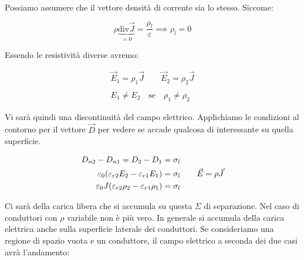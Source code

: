 Possiamo assumere che il vettore densità di corrente sia lo stesso.
Siccome:

\[
	\rho \underbrace{\text{div}\vec{J}}_{=0} = \frac{\rho_l}{\varepsilon} \implies \rho_l = 0
\]

Essendo le resistività diverse avremo:

\begin{gather*}
	\vec{E}_1 = \rho_1 \vec{J} \qquad \vec{E}_2 = \rho_2 \vec{J} \\\\
	E_1 \neq E_2 \quad \text{se} \quad \rho_1 \neq \rho_2
\end{gather*}

Vi sarà quindi una discontinuità del campo elettrico. Applichiamo le condizioni al contorno per il vettore $\vec{D}$ per vedere se accade qualcosa di interessante su quella superficie.

\begin{align*}
	D_{n2}-D_{n1}=D_2-D_1&=\sigma_l \\
	\varepsilon_0 (\varepsilon_{r2}E_2 - \varepsilon_{r1} E_1 ) &= \sigma_l \tag*{$ \vec{E} = \rho \vec{J}  $} \\
	\varepsilon_0 J(\varepsilon_{r2}\rho_2 - \varepsilon_{r1} \rho_1 ) &= \sigma_l
\end{align*}

Ci sarà della carica libera che si accumula su questa $ \Sigma  $ di separazione. Nel caso di conduttori con $\rho$ variabile non è più vero. In generale si accumula della carica elettrica anche sulla superficie laterale dei conduttori. Se consideriamo una regione di spazio vuota e un conduttore, il campo elettrico a seconda dei due casi avrà l'andamento:

